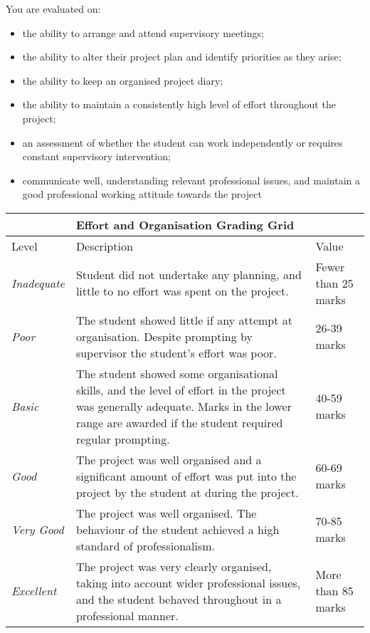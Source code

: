\documentclass[11pt]{article}
\newcommand{\interimreportweight}{10\% }
\begin{document}
You are evaluated on:
\begin{itemize}
\item the ability to arrange and attend supervisory meetings;
\item the ability to alter their project plan and identify priorities as they arise;
\item the ability to keep an organised project diary;
\item the ability to maintain a consistently high level of effort throughout the project;
\item an assessment of whether the student can work independently or requires constant supervisory
intervention;
\item communicate well, understanding relevant professional issues, and maintain a good professional working attitude towards the project
\end{itemize}

\vspace*{10mm}

\noindent
\begin{tabular}{||l|p{10cm}|l||}
\hline
\hline
\multicolumn{3}{||c||}{\textbf{Effort and Organisation Grading Grid}}\\
\hline
\hline
Level & Description & Value\\
\hline
\textit{Inadequate} & Student did not undertake any planning, and little to no effort was spent on the
project.

 & Fewer than 25 marks\\ \hline
\textit{Poor} &The student showed little if any attempt at organisation. Despite prompting by supervisor the
student’s effort was poor.
 & 26-39 marks\\ \hline
\textit{Basic} &
The student showed some organisational skills, and the level of effort in the project was generally
adequate.  Marks in the lower range are awarded if the student required regular prompting.

 & 40-59 marks\\ \hline
\textit{Good} &  The project was well organised and a significant amount of effort was put into the project by the student
at during the project.
& 60-69 marks\\ \hline
\textit{Very Good} &  The project was well organised.  The behaviour of the student achieved a high standard of professionalism.

 & 70-85 marks\\ \hline
\textit{Excellent} &  The project was very clearly organised, taking into account wider professional issues, and the student behaved throughout in a professional
manner.

 & More than 85 marks\\
\hline\hline
\end{tabular}
\end{document}
